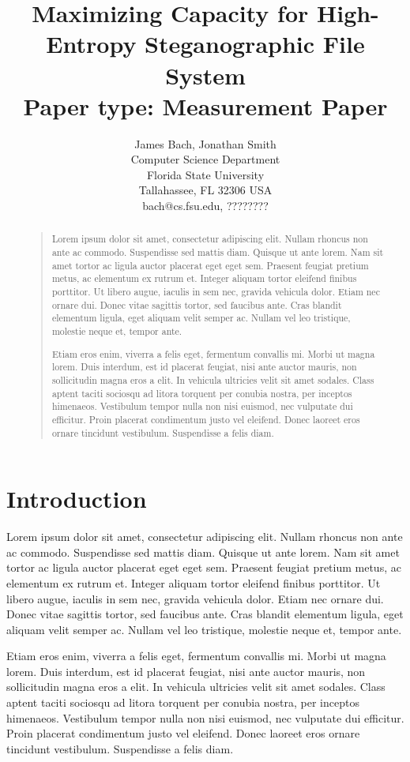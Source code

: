 \documentclass[letterpaper]{article}
\title{Maximizing Capacity for High-Entropy Steganographic File System\\
Paper type: Measurement Paper }
\author{James Bach, Jonathan Smith\\
Computer Science Department\\
Florida State University\\
Tallahassee, FL 32306  USA\\
bach@cs.fsu.edu, ????????\\
}
\begin{document}
 
\maketitle

\begin{abstract}
\begin{quote}
Lorem ipsum dolor sit amet, consectetur adipiscing elit. Nullam rhoncus non ante ac commodo. Suspendisse sed mattis diam. Quisque ut ante lorem. Nam sit amet tortor ac ligula auctor placerat eget eget sem. Praesent feugiat pretium metus, ac elementum ex rutrum et. Integer aliquam tortor eleifend finibus porttitor. Ut libero augue, iaculis in sem nec, gravida vehicula dolor. Etiam nec ornare dui. Donec vitae sagittis tortor, sed faucibus ante. Cras blandit elementum ligula, eget aliquam velit semper ac. Nullam vel leo tristique, molestie neque et, tempor ante.

Etiam eros enim, viverra a felis eget, fermentum convallis mi. Morbi ut magna lorem. Duis interdum, est id placerat feugiat, nisi ante auctor mauris, non sollicitudin magna eros a elit. In vehicula ultricies velit sit amet sodales. Class aptent taciti sociosqu ad litora torquent per conubia nostra, per inceptos himenaeos. Vestibulum tempor nulla non nisi euismod, nec vulputate dui efficitur. Proin placerat condimentum justo vel eleifend. Donec laoreet eros ornare tincidunt vestibulum. Suspendisse a felis diam.
\end{quote}
\end{abstract}

\section{Introduction}
Lorem ipsum dolor sit amet, consectetur adipiscing elit. Nullam rhoncus non ante ac commodo. Suspendisse sed mattis diam. Quisque ut ante lorem. Nam sit amet tortor ac ligula auctor placerat eget eget sem. Praesent feugiat pretium metus, ac elementum ex rutrum et. Integer aliquam tortor eleifend finibus porttitor. Ut libero augue, iaculis in sem nec, gravida vehicula dolor. Etiam nec ornare dui. Donec vitae sagittis tortor, sed faucibus ante. Cras blandit elementum ligula, eget aliquam velit semper ac. Nullam vel leo tristique, molestie neque et, tempor ante.

Etiam eros enim, viverra a felis eget, fermentum convallis mi. Morbi ut magna lorem. Duis interdum, est id placerat feugiat, nisi ante auctor mauris, non sollicitudin magna eros a elit. In vehicula ultricies velit sit amet sodales. Class aptent taciti sociosqu ad litora torquent per conubia nostra, per inceptos himenaeos. Vestibulum tempor nulla non nisi euismod, nec vulputate dui efficitur. Proin placerat condimentum justo vel eleifend. Donec laoreet eros ornare tincidunt vestibulum. Suspendisse a felis diam.
\end{document}

